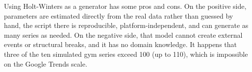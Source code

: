 \documentclass[11pt,a4paper]{article}
\begin{document}
Using Holt-Winters as a generator has some pros and cons. On the positive side, parameters are estimated directly from the real data rather than guessed by hand, the script there is reproducible, platform-independent, and can generate as many series as needed. On the negative side, that model cannot create external events or structural breaks, and it has no domain knowledge. It happens that three of the ten simulated gym series exceed 100 (up to 110), which is impossible on the Google Trends scale.

%
%
\end{document}
